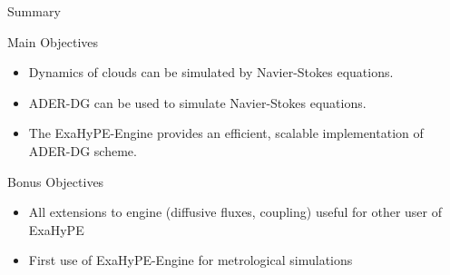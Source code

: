 \documentclass{beamer}
\begin{document}
\begin{frame}{Summary}
  \begin{block}{Main Objectives}
  \begin{itemize}
  \item Dynamics of clouds can be simulated by Navier-Stokes equations.
  \item ADER-DG can be used to simulate Navier-Stokes equations.
  \item The ExaHyPE-Engine provides an efficient, scalable implementation of ADER-DG scheme. 
  \end{itemize}
  \end{block}

  \begin{block}{Bonus Objectives}
    \begin{itemize}
    \item All extensions to engine (diffusive fluxes, coupling) useful for other user of ExaHyPE
    \item First use of ExaHyPE-Engine for metrological simulations
    \end{itemize}

  \end{block}
\end{frame}
\end{document}
